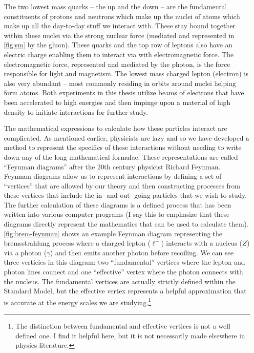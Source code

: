 The two lowest mass quarks -- the up and the down -- are the fundamental constituents of protons
and neutrons which make up the nuclei of atoms which make up all the day-to-day stuff we interact
with. These stay bound together within these nuclei via the strong nuclear force (mediated and
represented in \cref{fig:sm} by the gluon). These quarks and the top row of leptons also have an
electric charge enabling them to interact via with electromagnetic force.
The electromagnetic force, represented and mediated by the photon, is the force
responsible for light and magnetism. The lowest mass charged lepton (electron) is also very
abundant -- most commonly residing in orbits around nuclei helping form atoms. Both experiments in
this thesis utilize beams of electrons that have been accelerated to high energies and then
impinge upon a material of high density to initiate interactions for further study.

The mathematical expressions to calculate how these particles interact are complicated. As
mentioned earlier, physicists are lazy and so we have developed a method to represent the specifics
of these interactions without needing to write down any of the long mathematical formulae. These
representations are called ``Feynman diagrams'' after the 20th century physicist Richard Feynman.
Feynman diagrams allow us to represent interactions by defining a set of ``vertices'' that are
allowed by our theory and then constructing processes from these vertices that include the in- and
out- going particles that we wish to study. The further calculation of these diagrams is a defined
process that has been written into various computer programs (I say this to emphasize that these
diagrams directly represent the mathematics that can be used to calculate them).
\cref{fig:brem-feynman} shows an example Feynman diagram representing the bremsstrahlung process
where a charged lepton (\(\ell^-\)) interacts with a nucleus (\(Z\)) via a photon (\(\gamma\)) and
then emits another photon before recoiling. We can see three verticies in this diagram: two
``fundamental'' vertices where the lepton and photon lines connect and one ``effective'' vertex
where the photon connects with the nucleus. The fundamental vertices are actually strictly defined
within the Standard Model, but the effective vertex represents a helpful approximation that is
accurate at the energy scales we are studying.\footnote{ The distinction between fundamental and
	effective vertices is not a well defined one. I find it helpful here, but it is not necessarily
	made elsewhere in physics literature. }


